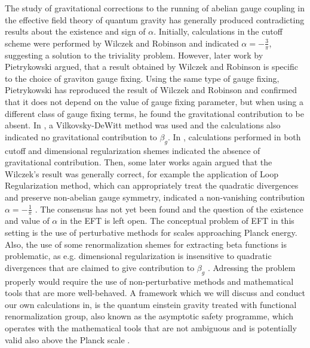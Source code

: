 \documentclass[11pt, a4paper]{article}
\begin{document}
The study of gravitational corrections to the running of abelian gauge coupling in the effective field theory of quantum gravity has generally produced contradicting results about the existence and sign of $\alpha$.
Initially, calculations in the cutoff scheme were performed by Wilczek and Robinson \cite{wilczek} and indicated
$\alpha = - \frac{3}{\pi} $, suggesting a solution to the triviality problem.
However, later work by Pietrykowski \cite{pietrykowski} argued, that a result obtained by Wilczek and Robinson is specific to the choice of graviton gauge fixing.
Using the same type of gauge fixing, Pietrykowski has reproduced the result of Wilczek and Robinson and confirmed that it does not depend on the value of gauge fixing parameter, but when using a different class of gauge fixing terms, he found the gravitational contribution to be absent.
In \cite{toms}, a Vilkovsky-DeWitt method was used and the calculations also indicated no gravitational contribution to $\beta_g$.
In \cite{absence}, calculations performed in both cutoff and dimensional regularization shemes indicated the absence of gravitational contribution.
Then, some later works again argued that the Wilczek's result was generally correct, for example the application of Loop Regularization method, which can appropriately treat the quadratic divergences and preserve non-abelian gauge symmetry,
indicated a non-vanishing contribution $\alpha = -\frac{1}{\pi} $ \cite{tang}.
The consensus has not yet been found and the question of the existence and value of $\alpha$ in the EFT is left open.
The conceptual problem of EFT in this setting is the use of perturbative methods for scales approaching Planck energy.
Also, the use of some renormalization shemes for extracting beta functions is problematic, as e.g. dimensional regularization is insensitive to quadratic
divergences that are claimed to give contribution to $\beta_g$ \cite{absence}.
Adressing the problem properly would require the use of non-perturbative methods and mathematical tools that are more well-behaved.
A framework which we will discuss and conduct our own calculations in, is the quantum einstein gravity treated with functional renormalization group, also known as the asymptotic safety programme, which operates with the mathematical tools that are not ambiguous and
is potentially valid also above the Planck scale \cite{qeg}.


\end{document}
